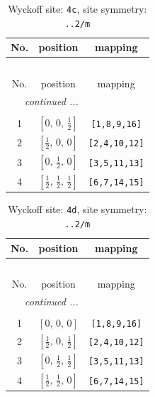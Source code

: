 \documentclass[fleqn,8pt]{jsarticle}
\begin{document}
\renewcommand{\arraystretch}{1.2}
\begin{longtable}{ccc}
\caption{Wyckoff site: {\tt 4c}, site symmetry: {\tt ..2/m}}
 \\
 \hline \hline
No. & position & mapping \\ \hline \endfirsthead

\multicolumn{2}{l}{\tablename\ \thetable{}} \\
 \hline \hline
No. & position & mapping \\ \hline \endhead

 \hline \hline
\multicolumn{2}{r}{\footnotesize\it continued ...} \\ \endfoot

 \hline \hline
\multicolumn{2}{r}{} \\ \endlastfoot

1 & $\left[ 0,\, 0,\, \frac{1}{2} \right]$ & {\tt [1,8,9,16]} \\ \hline
2 & $\left[ \frac{1}{2},\, 0,\, 0 \right]$ & {\tt [2,4,10,12]} \\ \hline
3 & $\left[ 0,\, \frac{1}{2},\, 0 \right]$ & {\tt [3,5,11,13]} \\ \hline
4 & $\left[ \frac{1}{2},\, \frac{1}{2},\, \frac{1}{2} \right]$ & {\tt [6,7,14,15]} \\
\end{longtable}
\renewcommand{\arraystretch}{1.2}
\begin{longtable}{ccc}
\caption{Wyckoff site: {\tt 4d}, site symmetry: {\tt ..2/m}}
 \\
 \hline \hline
No. & position & mapping \\ \hline \endfirsthead

\multicolumn{2}{l}{\tablename\ \thetable{}} \\
 \hline \hline
No. & position & mapping \\ \hline \endhead

 \hline \hline
\multicolumn{2}{r}{\footnotesize\it continued ...} \\ \endfoot

 \hline \hline
\multicolumn{2}{r}{} \\ \endlastfoot

1 & $\left[ 0,\, 0,\, 0 \right]$ & {\tt [1,8,9,16]} \\ \hline
2 & $\left[ \frac{1}{2},\, 0,\, \frac{1}{2} \right]$ & {\tt [2,4,10,12]} \\ \hline
3 & $\left[ 0,\, \frac{1}{2},\, \frac{1}{2} \right]$ & {\tt [3,5,11,13]} \\ \hline
4 & $\left[ \frac{1}{2},\, \frac{1}{2},\, 0 \right]$ & {\tt [6,7,14,15]} \\
\end{longtable}
\end{document}

